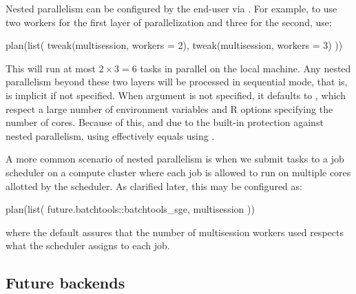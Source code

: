 Nested parallelism can be configured by the end-user
via .  For example, to use two workers for the first
layer of parallelization and three for the second, use:
\begin{example}
plan(list(
  tweak(multisession, workers = 2),
  tweak(multisession, workers = 3)
))
\end{example}
This will run at most $2 \times 3 = 6$ tasks in parallel on the local
machine.  Any nested parallelism beyond these two layers will be
processed in sequential mode, that is,  is
implicit if not specified.  When argument  is not
specified, it defaults to , which
respect a large number of environment variables and R options
specifying the number of cores.  Because of this, and due to the
built-in protection against nested parallelism, using
 effectively equals using
.

A more common scenario of nested parallelism is when we submit tasks
to a job scheduler on a compute cluster where each job is allowed to
run on multiple cores allotted by the scheduler.  As clarified later,
this may be configured as:
\begin{example}
plan(list(
  future.batchtools::batchtools_sge,
  multisession
))
\end{example}
where the default  assures that the number of
multisession workers used respects what the scheduler assigns to each
job.


\subsection{Future backends}
\label{future-backends}

